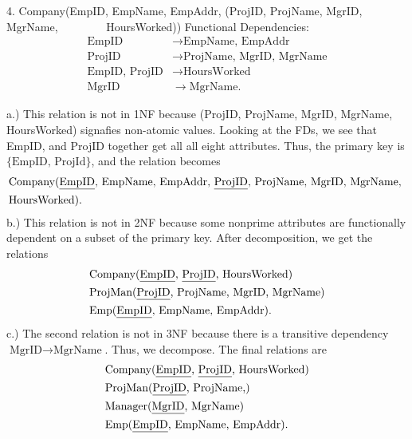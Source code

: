 \documentclass{report}
\begin{document}
   \pagebreak 
   \begin{mdframed}
       4. Company(EmpID, EmpName, EmpAddr, (ProjID, ProjName, MgrID, MgrName, \smallbreak
       \ \ \ \ \ \ \ \ HoursWorked)) 
       \bigbreak \noindent 
    Functional Dependencies:
    \begin{align*}
        \text{EmpID} &\to \text{EmpName, EmpAddr} \\
        \text{ProjID} &\to \text{ProjName, MgrID, MgrName} \\
        \text{EmpID, ProjID} &\to \text{HoursWorked} \\
        \text{MgrID} &\to \text{MgrName}
    .\end{align*}
   \end{mdframed}
   \bigbreak \noindent 
   a.) This relation is not in 1NF because  (ProjID, ProjName, MgrID, MgrName, HoursWorked) signafies non-atomic values. Looking at the FDs, we see that EmpID, and ProjID together get all all eight attributes. Thus, the primary key is $\{\text{EmpID, ProjId}\}$, and the relation becomes
   \begin{align*}
       &\text{Company(\underline{EmpID}, EmpName, EmpAddr, \underline{ProjID}, ProjName, MgrID, MgrName, }\\
       &\text{HoursWorked)}
   .\end{align*}
   \bigbreak \noindent 
   b.) This relation is not in 2NF because some nonprime attributes are functionally dependent on a subset of the primary key. After decomposition, we get the relations
   \begin{align*}
       &\text{Company(\underline{EmpID}, \underline{ProjID}, HoursWorked)} \\
       &\text{ProjMan(\underline{ProjID}, ProjName, MgrID, MgrName)} \\
       &\text{Emp(\underline{EmpID}, EmpName, EmpAddr)}
   .\end{align*}
   \bigbreak \noindent 
   c.) The second relation is not in 3NF because there is a transitive dependency $\text{MgrID} \to \text{MgrName} $. Thus, we decompose. The final relations are
   \begin{align*}
      &\text{Company(\underline{EmpID}, \underline{ProjID}, HoursWorked)} \\
       &\text{ProjMan(\underline{ProjID}, ProjName,)} \\
       &\text{Manager(\underline{MgrID}, MgrName)} \\
       &\text{Emp(\underline{EmpID}, EmpName, EmpAddr)}
   .\end{align*}
\end{document}
